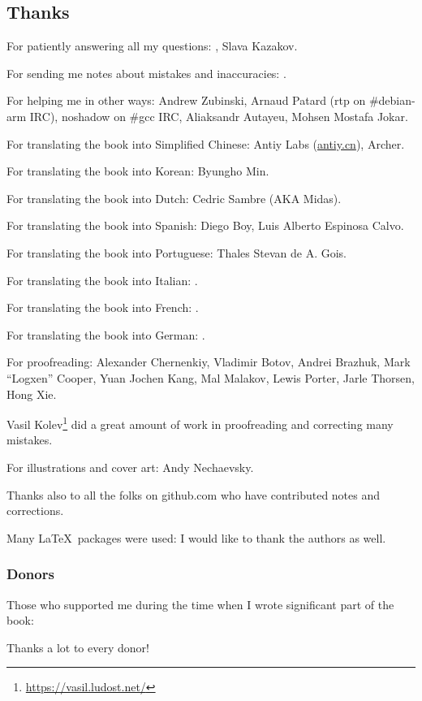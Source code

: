 \subsection*{Thanks}

For patiently answering all my questions: \HERMIT, Slava  Kazakov.

For sending me notes about mistakes and inaccuracies: \PeopleMistakesInaccuracies{}.

For helping me in other ways:
Andrew Zubinski,
Arnaud Patard (rtp on \#debian-arm IRC),
noshadow on \#gcc IRC,
Aliaksandr Autayeu,
Mohsen Mostafa Jokar.

For translating the book into Simplified Chinese:
Antiy Labs (\href{http://antiy.cn}{antiy.cn}), Archer.

For translating the book into Korean: Byungho Min.

For translating the book into Dutch: Cedric Sambre (AKA Midas).

For translating the book into Spanish: Diego Boy, Luis Alberto Espinosa Calvo.

For translating the book into Portuguese: Thales Stevan de A. Gois.

For translating the book into Italian: \PeopleItalianTranslators{}.

For translating the book into French: \PeopleFrenchTranslators{}.

For translating the book into German: \PeopleGermanTranslators{}.

For proofreading:
Alexander  Chernenkiy,
Vladimir Botov,
Andrei Brazhuk,
Mark ``Logxen'' Cooper, Yuan Jochen Kang, Mal Malakov, Lewis Porter, Jarle Thorsen, Hong Xie.

Vasil Kolev\footnote{\url{https://vasil.ludost.net/}} did a great amount of work in proofreading and correcting many mistakes.

For illustrations and cover art: Andy Nechaevsky.

Thanks also to all the folks on github.com who have contributed notes and corrections.

Many \LaTeX\ packages were used: I would like to thank the authors as well.

\subsubsection*{Donors}

Those who supported me during the time when I wrote significant part of the book:



Thanks a lot to every donor!
